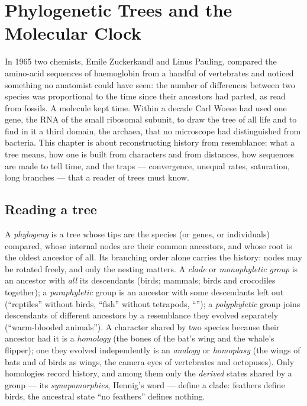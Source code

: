 \chapter{Phylogenetic Trees and the Molecular Clock}\label{ch:b2:phylogenetic-trees}

In 1965 two chemists, Emile Zuckerkandl and Linus Pauling, compared
the amino-acid sequences of haemoglobin from a handful of
vertebrates and noticed something no anatomist could have seen:
the number of differences between two species was proportional to
the time since their ancestors had parted, as read from fossils.
A molecule kept time. Within a decade Carl Woese had used one gene,
the RNA of the small ribosomal subunit, to draw the tree of all
life and to find in it a third domain, the archaea, that no
microscope had distinguished from bacteria. This chapter is about
reconstructing history from resemblance: what a tree means, how one
is built from characters and from distances, how sequences are made
to tell time, and the traps --- convergence, unequal rates,
saturation, long branches --- that a reader of trees must know.

\section{Reading a tree}

\begin{definition}\label{def:b2:phylogenetic-trees:tree}
A \emph{phylogeny} is a tree whose tips are the species (or genes,
or individuals) compared, whose internal nodes are their common
ancestors, and whose root is the oldest ancestor of all. Its
branching order alone carries the history: nodes may be rotated
freely, and only the nesting matters. A \emph{clade} or
\emph{monophyletic group} is an ancestor with \emph{all} its
descendants (birds; mammals; birds and crocodiles together);
a \emph{paraphyletic} group is an ancestor with some descendants
left out (``reptiles'' without birds, ``fish'' without tetrapods,
``''); a \emph{polyphyletic} group joins descendants of
different ancestors by a resemblance they evolved separately
(``warm-blooded animals''). A character shared by two species
because their ancestor had it is a \emph{homology} (the bones of
the bat's wing and the whale's flipper); one they evolved
independently is an \emph{analogy} or \emph{homoplasy} (the wings
of bats and of birds as wings, the camera eyes of vertebrates and
octopuses). Only homologies record history, and among them only
the \emph{derived} states shared by a group --- its
\emph{synapomorphies}, Hennig's word --- define a clade: feathers
define birds, the ancestral state ``no feathers'' defines nothing.
\end{definition}

